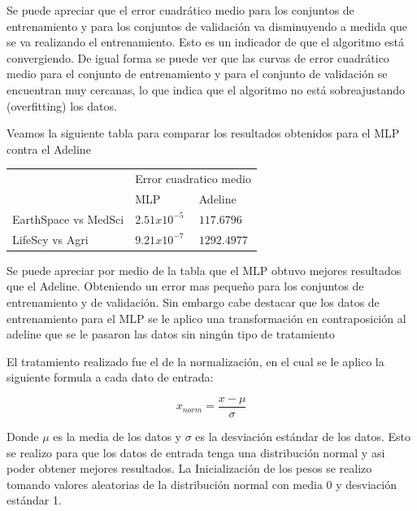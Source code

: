 \documentclass{article}
\theoremstyle{mytheoremstyle}
\theoremstyle{mytheoremstyle}
\theoremstyle{myproblemstyle}
\begin{document}
\newpage
Se puede  apreciar que el error cuadrático medio para los conjuntos de entrenamiento y para los conjuntos de validación va disminuyendo a medida que se va realizando el entrenamiento. Esto es un indicador de que el algoritmo está convergiendo. De igual forma se puede ver que las curvas de error cuadrático medio para el conjunto de entrenamiento y para el conjunto de validación se encuentran muy cercanas, lo que indica que el algoritmo no está sobreajustando (overfitting) los datos.

Veamos la siguiente tabla para comparar los resultados obtenidos para el MLP contra el Adeline

\begin{table}[!h]
  \centering
  \begin{tabular}{lll}
    \cline{2-3}
                         & \multicolumn{2}{l}{Error cuadratico medio}               \\ \cline{2-3}
                         & MLP                                        & Adeline     \\ \hline
    EarthSpace vs MedSci & $2.51x10^{-5}$                             & $117.6796$  \\ \hline
    LifeScy vs Agri      & $9.21x10^{-7}$                             & $1292.4977$ \\ \hline
  \end{tabular}
\end{table}

Se puede apreciar por medio de la tabla que el MLP obtuvo mejores resultados que el Adeline. Obteniendo un error mas pequeño para los conjuntos de entrenamiento y de validación. Sin embargo cabe destacar que los datos de entrenamiento para el MLP se le aplico una transformación en contraposición al adeline que se le pasaron las datos sin ningún tipo de tratamiento

El tratamiento realizado fue el de la normalización, en el cual se le aplico la siguiente formula a cada dato de entrada:

\begin{equation*}
  x_{norm} = \frac{x - \mu}{\sigma}
\end{equation*}

Donde $\mu$ es la media de los datos y $\sigma$ es la desviación estándar de los datos. Esto se realizo para que los datos de entrada tenga una distribución normal y asi poder obtener mejores resultados. La Inicialización de los pesos se realizo tomando valores aleatorias de la distribución normal con media 0 y desviación estándar 1.
\end{document}

